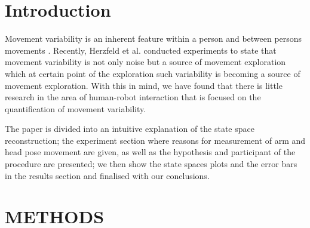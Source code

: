 \documentclass{sigchi}
\def\plainkeywords{Authors' choice; of terms; separated; by
  semicolons; include commas, within terms only; required.}
\begin{document}



\section{Introduction}

Movement variability is an inherent feature within a person and between persons
movements \cite{newell1993variability}. Recently, Herzfeld et al. \cite{Herzfeld2014}
conducted experiments to state that movement variability is not only noise but a
source of movement exploration which at certain point of the exploration
such variability is becoming a source of movement exploration.
With this in mind, we have found that there is little research in the area of
human-robot interaction that is focused on the quantification of movement variability.

The paper is divided into an intuitive explanation of the state space reconstruction;
the experiment section where reasons for measurement of arm and head pose
movement are given,
as well as the hypothesis and participant of the procedure are presented;
we then show the state spaces plots and the error bars in the results section and
finalised with our conclusions.
\section{METHODS}
\end{document}
